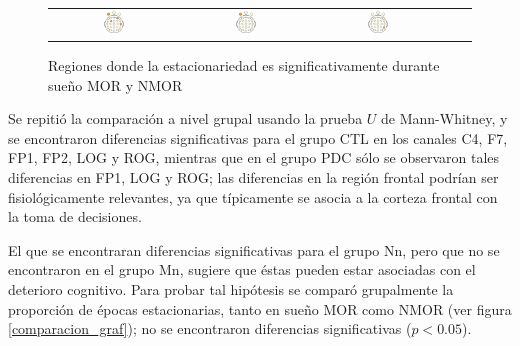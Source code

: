 \begin{figure}
\begin{tabular}{ccccc}
\includegraphics[width=0.17\textwidth]{./img_diagramas/cabeza_new_RRU.pdf} &
\includegraphics[width=0.17\textwidth]{./img_diagramas/cabeza_new_JGZ.pdf} &
\includegraphics[width=0.17\textwidth]{./img_diagramas/cabeza_new_AEFP.pdf} \\
\end{tabular}
\caption{Regiones donde la estacionariedad es significativamente durante
sueño MOR y NMOR}
\label{cabeza_new}
\end{figure}

Se repitió la comparación a nivel 
grupal usando la prueba $U$ de  Mann-Whitney,
y se encontraron diferencias significativas para el grupo CTL en los canales C4, F7, FP1, 
FP2, LOG y ROG, mientras que en el grupo PDC sólo se observaron tales diferencias en FP1, LOG y ROG;
las diferencias en la región frontal podrían ser fisiológicamente relevantes, ya que típicamente se 
asocia a la corteza frontal con la toma de decisiones.

El que se encontraran diferencias significativas para el grupo Nn, pero que no se encontraron en el
grupo Mn, sugiere que éstas pueden estar asociadas con el deterioro cognitivo.
Para probar tal hipótesis se comparó grupalmente la proporción de épocas estacionarias, tanto en
sueño MOR como NMOR (ver figura \ref{comparacion_graf}); no se encontraron diferencias
significativas ($p<0.05$).

